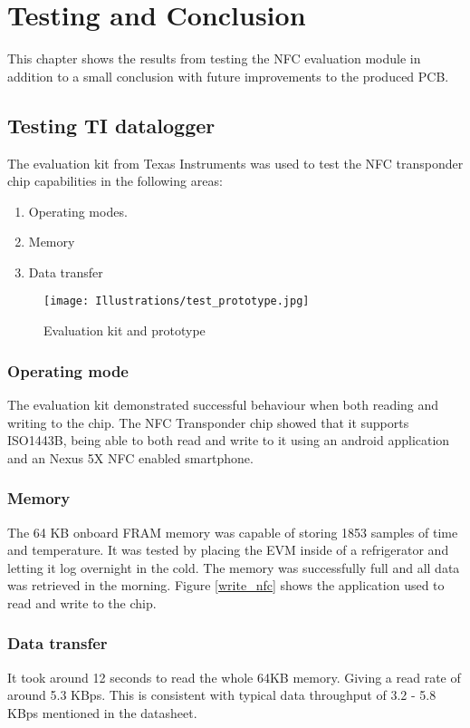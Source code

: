 
\chapter{Testing and Conclusion}
This chapter shows the results from testing the NFC evaluation module \cite{NFC_Module} in addition to a small conclusion with future improvements to the produced PCB.


\section{Testing TI datalogger}
The evaluation kit from Texas Instruments was used to test the NFC transponder chip capabilities in the following areas:

\begin{enumerate}
\item Operating modes.
\item Memory
\item Data transfer
\end{enumerate} 

\begin{figure}[h]
\begin{center}
\center
\texttt{[image: Illustrations/test\_prototype.jpg]}  
\caption{Evaluation kit and prototype}
\label{prototype}
\end{center}
\end{figure}
\subsection{Operating mode}
The evaluation kit demonstrated successful behaviour when both reading and writing to the chip. 
The NFC Transponder chip showed that it supports ISO1443B, being able to both read and write to it using an android application and an Nexus  5X NFC enabled smartphone. 
\subsection{Memory}
The 64 KB onboard FRAM memory was capable of storing 1853 samples of time and temperature. It was tested by placing the EVM inside of a refrigerator and letting it log overnight in the cold. The memory was successfully full and all data was retrieved in the morning. Figure \ref{write_nfc} shows the application used to read and write to the chip. 


\subsection{Data transfer}
It took around 12 seconds to read the whole 64KB memory. Giving a read rate of around 5.3 KBps. This is consistent with typical data throughput of 3.2 - 5.8 KBps mentioned in the datasheet. 


